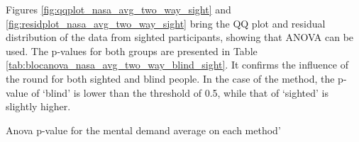 %
%
Figures \ref{fig:qqplot_nasa_avg_two_way_sight} and \ref{fig:residplot_nasa_avg_two_way_sight} bring the QQ plot and residual distribution of the data from sighted participants, showing that ANOVA can be used. The p-values for both groups are presented in Table \ref{tab:blocanova_nasa_avg_two_way_blind_sight}. It confirms the influence of the round for both sighted and blind people. In the case of the method, the p-value of ‘blind’ is lower than the threshold of 0.5, while that of ‘sighted’ is slightly higher.

\begin{table}
    \caption{Anova p-value for the mental demand average on each method'}
    \label{tab:blocanova_nasa_avg_two_way_blind_sight}
    \begin{minipage}{0.45\textwidth}
        
    \end{minipage}
    \begin{minipage}{0.45\textwidth}
            
    \end{minipage}
\end{table}



